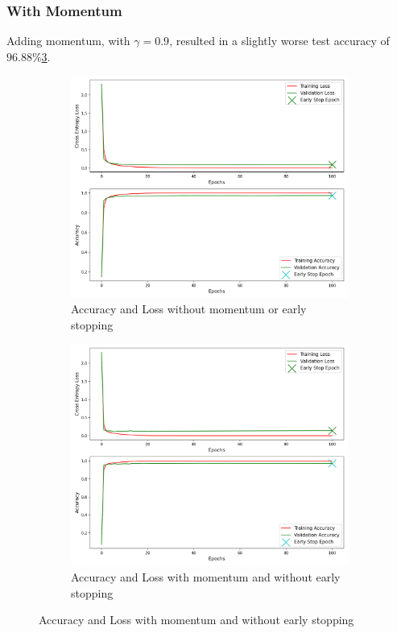 \subsubsection{With Momentum}

Adding momentum, with $\gamma = 0.9$, resulted in a slightly worse test accuracy of $96.88\%$\cref{fig:momentum_no_early_stop}.

\begin{figure}[H]
	\begin{subfigure}{0.5\textwidth}
		\centering
		\includegraphics[width=1.0\textwidth]{./images/no_momentum_no_early_stop.png}
		\caption{Accuracy and Loss without momentum or early stopping}
		\label{fig:no_momentum_no_early_stop}
	\end{subfigure}
	\begin{subfigure}{0.5\textwidth}
		\centering
		\includegraphics[width=1.0\textwidth]{./images/momentum_no_early_stop.png}
		\caption{Accuracy and Loss with momentum and without early stopping}
		\label{fig:momentum_no_early_stop}
	\end{subfigure}
\end{figure}

